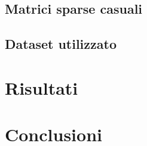 \documentclass[]{IEEEtran}
\begin{document}
	\subsection{Matrici sparse casuali}

	\subsection{Dataset utilizzato}
	
	
\section{Risultati}
\label{risultati}

\section{Conclusioni}
\label{conclusioni}





\end{document}

